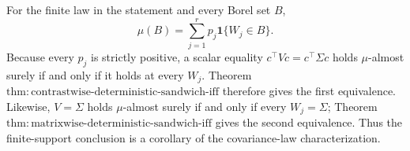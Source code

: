 For the finite law in the statement and every Borel set \(B\),
\[
 \mu(B)=\sum_{j=1}^rp_j\mathbf1\{W_j\in B\}.
\tag{1}
\]
Because every \(p_j\) is strictly positive, a scalar equality \(c^\top Vc=c^\top\Sigma c\) holds \(\mu\)-almost surely if and only if it holds at every \(W_j\). Theorem \(\mathrm{thm:contrastwise\text{-}deterministic\text{-}sandwich\text{-}iff}\) therefore gives the first equivalence. Likewise, \(V=\Sigma\) holds \(\mu\)-almost surely if and only if every \(W_j=\Sigma\); Theorem \(\mathrm{thm:matrixwise\text{-}deterministic\text{-}sandwich\text{-}iff}\) gives the second equivalence. Thus the finite-support conclusion is a corollary of the covariance-law characterization.